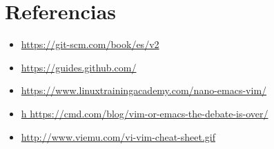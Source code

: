\documentclass{article}
\begin{document}
\clearpage		

\section{Referencias}
\begin{itemize}			
	\item \url{https://git-scm.com/book/es/v2}
	\item \url{https://guides.github.com/}
	\item \url{https://www.linuxtrainingacademy.com/nano-emacs-vim/}
	\item \url{h https://cmd.com/blog/vim-or-emacs-the-debate-is-over/}
	\item \url{http://www.viemu.com/vi-vim-cheat-sheet.gif}

\end{itemize}	

	
%
%
%
			
\end{document}
